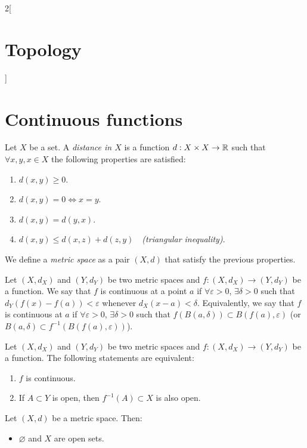 \documentclass[../../../main.tex]{subfiles}
\begin{document}
\begin{multicols}{2}[\section{Topology}]
  \section{Continuous functions}
  \begin{definition}
    Let $X$ be a set. A \textit{distance in $X$} is a function $d:X\times X\rightarrow\mathbb{R} $ such that $\forall x,y,x\in X$ the following properties are satisfied:
    \begin{enumerate}
      \item $d(x,y)\geq 0$.
      \item $d(x,y)=0\iff x=y$.
      \item $d(x,y)=d(y,x)$.
      \item $d(x,y)\leq d(x,z)+d(z,y)\quad$\textit{(triangular inequality)}.
    \end{enumerate}
    We define a \textit{metric space} as a pair $(X,d)$ that satisfy the previous properties.
  \end{definition}
  \begin{definition}
    Let $(X,d_X)$ and $(Y,d_Y)$ be two metric spaces and $f:(X,d_X)\rightarrow(Y,d_Y)$ be a function. We say that $f$ is continuous at a point $a$ if $\forall\varepsilon>0$, $\exists\delta>0$ such that $d_Y(f(x)-f(a))<\varepsilon$ whenever $d_X(x-a)<\delta$. Equivalently, we say that $f$ is continuous at $a$ if $\forall\varepsilon>0$, $\exists\delta>0$ such that $f(B(a,\delta))\subset B(f(a),\varepsilon)$ (or $B(a,\delta)\subset f^{-1}\left(B(f(a),\varepsilon)\right)$).
  \end{definition}
  \begin{theorem}
    Let $(X,d_X)$ and $(Y,d_Y)$ be two metric spaces and $f:(X,d_X)\rightarrow(Y,d_Y)$ be a function. The following statements are equivalent:
    \begin{enumerate}
      \item $f$ is continuous.
      \item If $A\subset Y$ is open, then $f^{-1}(A)\subset X$ is also open.
    \end{enumerate}
  \end{theorem}
  \begin{prop}
    Let $(X,d)$ be a metric space. Then:
    \begin{itemize}
      \item $\varnothing$ and $X$ are open sets.

\end{itemize}
\end{prop}
\end{multicols}
\end{document}
